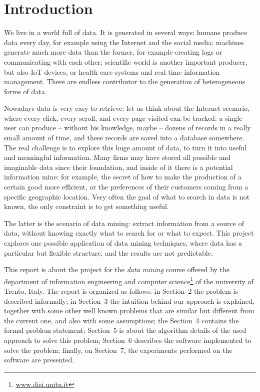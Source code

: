 \documentclass{acm_proc_article-sp-sigmod09}
\begin{document}


\section{Introduction}
We live in a world full of data. It is generated in several ways: humans produce data every day, for example using the Internet and the social media; machines generate much more data than the former, for example creating logs or communicating with each other; scientific world is another important producer, but also IoT devices, or health care systems and real time information management. There are endless contributor to the generation of heterogeneous forms of data.

Nowadays data is very easy to retrieve: let us think about the Internet scenario, where every click, every scroll, and every page visited can be tracked: a single user can produce -- without his knowledge, maybe -- dozens of records in a really small amount of time, and these records are saved into a database somewhere. The real challenge is to explore this huge amount of data, to turn it into useful and meaningful information. Many firms may have stored all possible and imaginable data since their foundation, and inside of it there is a potential information mine: for example, the secret of how to make the production of a certain good more efficient, or the preferences of their customers coming from a specific geographic location. Very often the goal of what to search in data is not known, the only constraint is to get something useful.

The latter is the scenario of data mining: extract information from a source of data, without knowing exactly what to search for or what to expect. This project explores one possible application of data mining techniques, where data has a particular but flexible structure, and the results are not predictable.

This report is about the project for the \emph{data mining} course offered by the department of information engineering and computer science\footnote{\url{www.disi.unitn.it}} of the university of Trento, Italy. The report is organized as follows: in Section~2 the problem is described informally; in Section~3 the intuition behind our approach is explained, together with some other well known problems that are similar but different from the current one, and also with some assumptions; the Section~4 contains the formal problem statement; Section~5 is about the algorithm details of the used approach to solve this problem; Section~6 describes the software implemented to solve the problem; finally, on Section~7, the experiments performed on the software are presented.
\end{document}
